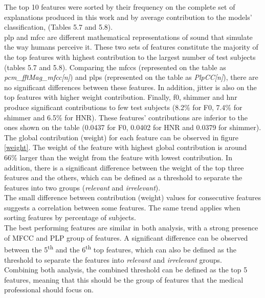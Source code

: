 The top 10 features were sorted by their frequency on the complete set of explanations produced in this work and by average contribution to the models' classification, (Tables 5.7 and 5.8). \\
\gls{plp} and \gls{mfcc} are different mathematical representations of sound that simulate the way humans perceive it. These two sets of features constitute the majority of the top features with highest contribution to the largest number of test subjects (tables 5.7 and 5.8).
Comparing the \gls{mfcc}s (represented on the table as \textit{pcm\_fftMag\_mfcc[n]}) and \gls{plp}s (represented on the table as \textit{PlpCC[n]}), there are no significant differences between these features. In addition, jitter is also on the top features with higher weight contribution. Finally, \gls{f0}, shimmer and \gls{hnr} produce significant contributions to few test subjects (8.2\% for F0, 7.4\% for shimmer and 6.5\% for HNR). These features' contributions are inferior to the ones shown on the table (0.0437 for F0, 0.0402 for HNR and 0.0379 for shimmer). \\
The global contribution (weight) for each feature can be observed in figure \ref{weight}. The weight of the feature with highest global contribution is around 66\% larger than the weight from the feature with lowest contribution. In addition, there is a significant difference between the weight of the top three features and the others, which can be defined as a threshold to separate the features into two groups (\textit{relevant} and \textit{irrelevant}). \\
The small difference between contribution (weight) values for consecutive features suggests a correlation between some features. The same trend applies when sorting features by percentage of subjects. \\ 
The best performing features are similar in both analysis, with a strong presence of MFCC and PLP group of features. A significant difference can be observed between the 5\textsuperscript{th} and the 6\textsuperscript{th} top features, which can also be defined as the threshold to separate the features into \textit{relevant} and \textit{irrelevant} groups. \\
Combining both analysis, the combined threshold can be defined as the top 5 features, meaning that this should be the group of features that the medical professional should focus on.

